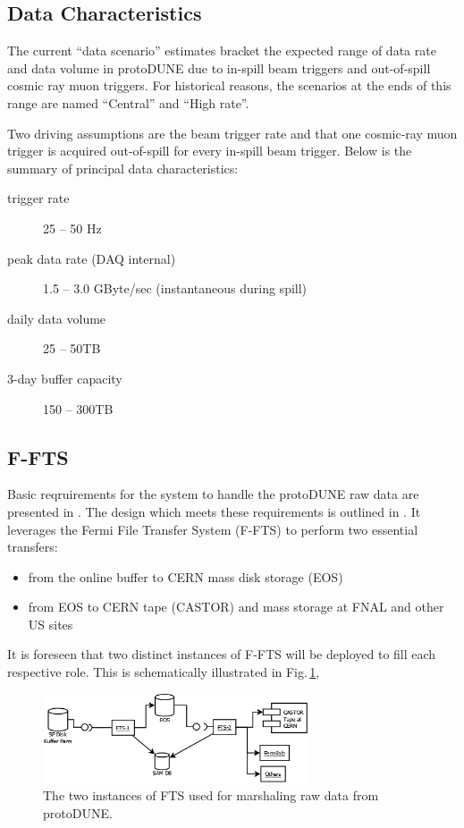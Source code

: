 \documentclass[pdftex,12pt,letter]{article}
\newcommand{\pd}{protoDUNE\xspace}
\begin{document}
\subsection{Data Characteristics}

The current ``data scenario'' estimates \cite{docdb1086} bracket the expected range of data rate
and data volume in \pd \cite{docdb186} due to in-spill beam triggers and out-of-spill cosmic ray muon triggers.
For historical reasons, the scenarios at the ends of this range are named ``Central'' and ``High rate''.

Two driving assumptions are the beam trigger rate and that one
cosmic-ray muon trigger is acquired out-of-spill for every in-spill
beam trigger.  Below is the summary of principal data characteristics:

\begin{description}
\item[trigger rate] 25 -- 50 Hz
\item[peak data rate (DAQ internal)] 1.5 -- 3.0 GByte/sec (instantaneous during spill)
\item[daily data volume] 25 -- 50TB
\item[3-day buffer capacity] 150 -- 300TB
\end{description}

\subsection{F-FTS}
Basic reqruirements for the system to handle the \pd raw data are presented in \cite{docdb1209}.
The design which meets these requirements is outlined in \cite{docdb1212}. It leverages the
Fermi File Transfer System (F-FTS) to perform two essential transfers:
\begin{itemize}
\item from the online buffer to CERN mass disk storage (EOS)
\item from EOS to CERN tape (CASTOR) and  mass storage at FNAL and other US sites
\end{itemize}

\noindent It is foreseen that two distinct instances of F-FTS will be deployed to fill each
respective role. This is schematically illustrated in Fig.\,\ref{fig:ftsinstances},

\begin{figure}[tbh]
  \centering
  \includegraphics[width=0.7\textwidth]{figures/ftsinstances_v2.png}
  \caption{The two instances of FTS used for marshaling raw data from protoDUNE.}
  \label{fig:ftsinstances}
\end{figure}
\end{document}
